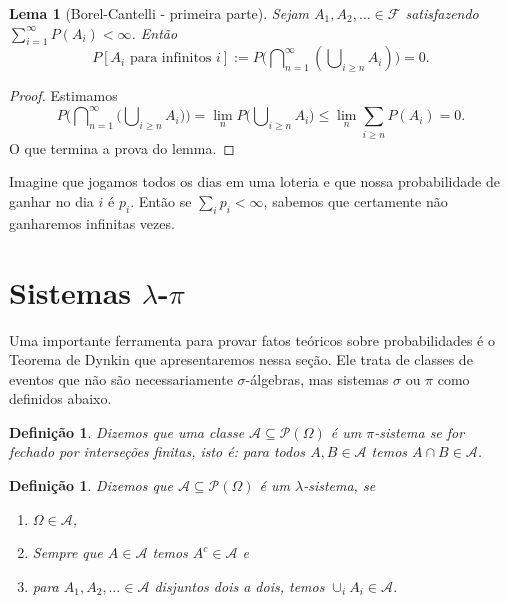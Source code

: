 \documentclass[reqno, draft]{book}
\newcommand*\1{\mathds{1}}
\newtheorem{lemma}[theorem]{Lema}
\newtheorem{definition}[theorem]{Definição}
\DeclareMathOperator*{\mcup}{{\textstyle \bigcup}}
\DeclareMathOperator*{\mcap}{{\textstyle \bigcap}}
\begin{document}
\begin{lemma}[Borel-Cantelli - primeira parte]
  Sejam $A_1, A_2, \dots \in \mathcal{F}$ satisfazendo $\sum_{i = 1}^\infty P(A_i) < \infty$.
  Então
  \begin{equation}
    P[\text{$A_i$ para infinitos $i$}] := P\big({\mcap\nolimits_{n = 1}^\infty} ({\mcup\nolimits_{i \geq n}} A_i)\big) = 0.
  \end{equation}
\end{lemma}

\begin{proof}
  Estimamos
  \begin{equation}
    P \Big( {\mcap_{n = 1}^\infty} \big({\mcup\nolimits_{i \geq n}} A_i \big) \Big) = \lim_n P \big( {\mcup\nolimits_{i \geq n}} A_i \big) \leq \lim_n {\textstyle\sum\limits_{i \geq n}} P(A_i) = 0.
  \end{equation}
  O que termina a prova do lemma.
\end{proof}

Imagine que jogamos todos os dias em uma loteria e que nossa probabilidade de ganhar no dia $i$ é $p_i$.
Então se $\sum_i p_i < \infty$, sabemos que certamente não ganharemos infinitas vezes.

\newpage

\section{Sistemas \texorpdfstring{$\lambda$-$\pi$}{lambda-pi}}

Uma importante ferramenta para provar fatos teóricos sobre probabilidades é o Teorema de Dynkin que apresentaremos nessa seção.
Ele trata de classes de eventos que não são necessariamente $\sigma$-álgebras, mas sistemas $\sigma$ ou $\pi$ como definidos abaixo.

\begin{definition}
  Dizemos que uma classe $\mathcal{A} \subseteq \mathcal{P}(\Omega)$ é um $\pi$-sistema  se for fechado por interseções finitas, isto é: para todos $A, B \in \mathcal{A}$ temos $A \cap B \in \mathcal{A}$.
\end{definition}

\begin{definition}
  Dizemos que $\mathcal{A} \subseteq \mathcal{P}(\Omega)$ é um $\lambda$-sistema,  se
  \begin{enumerate}[\quad a)]
  \item $\Omega \in \mathcal{A}$,
  \item Sempre que $A \in \mathcal{A}$ temos $A^c \in \mathcal{A}$ e
  \item para $A_1, A_2, \dots \in \mathcal{A}$ disjuntos dois a dois, temos $\cup_i A_i \in \mathcal{A}$.
  \end{enumerate}
\end{definition}
\end{document}
